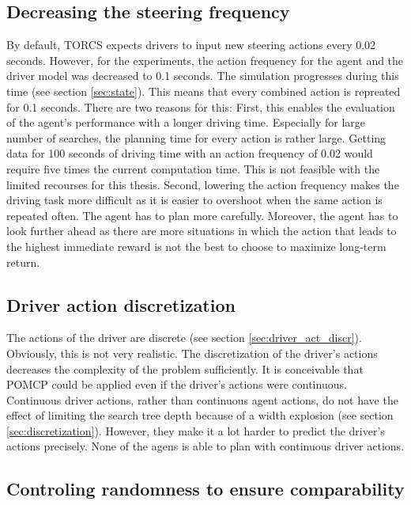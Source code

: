 \subsection{Decreasing the steering frequency}

By default, TORCS expects drivers to input new steering actions every 0.02 seconds. However, for the experiments, the action frequency for the agent and the driver model was decreased to 0.1 seconds. The simulation progresses during this time (see section \ref{sec:state}). This means that every combined action is repreated for 0.1 seconds. There are two reasons for this: First, this enables the evaluation of the agent's performance with a longer driving time. Especially for large number of searches, the planning time for every action is rather large. Getting data for 100 seconds of driving time with an action frequency of 0.02 would require five times the current computation time. This is not feasible with the limited recourses for this thesis. Second, lowering the action frequency makes the driving task more difficult as it is easier to overshoot when the same action is repeated often. The agent has to plan more carefully.  Moreover, the agent has to look further ahead as there are more situations in which the action that leads to the highest immediate reward is not the best to choose to maximize long-term return.

\subsection{Driver action discretization}

The actions of the driver are discrete (see section \ref{sec:driver_act_discr}). Obviously, this is not very realistic. The discretization of the driver's actions decreases the complexity of the problem sufficiently. It is conceivable that POMCP could be applied even if the driver's actions were continuous. Continuous driver actions, rather than continuous agent actions, do not have the effect of limiting the search tree depth because of a width explosion (see section \ref{sec:discretization}). However, they make it a lot harder to predict the driver's actions precisely. None of the agens is able to plan with continuous driver actions. 

\subsection{Controling randomness to ensure comparability}

